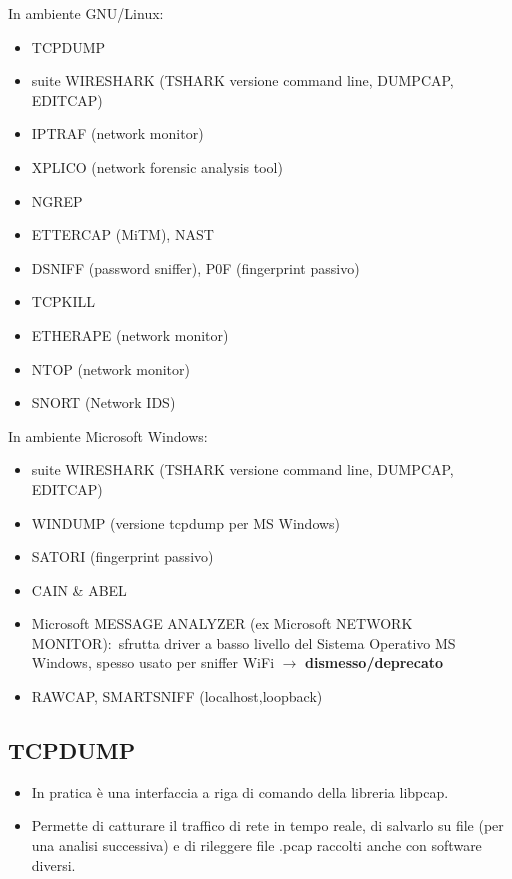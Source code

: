 In ambiente GNU/Linux:
\begin{itemize}
    \item TCPDUMP
    \item suite WIRESHARK (TSHARK versione command line, DUMPCAP, EDITCAP)
    \item IPTRAF (network monitor)
    \item XPLICO (network forensic analysis tool)
    \item NGREP
    \item ETTERCAP (MiTM), NAST
    \item DSNIFF (password sniffer), P0F (fingerprint passivo)
    \item TCPKILL
    \item ETHERAPE (network monitor)
    \item NTOP (network monitor)
    \item SNORT (Network IDS)
\end{itemize}
In ambiente Microsoft Windows:
\begin{itemize}
    \item suite WIRESHARK (TSHARK versione command line, DUMPCAP, EDITCAP)
    \item WINDUMP (versione tcpdump per MS Windows)
    \item SATORI (fingerprint passivo)
    \item CAIN \& ABEL
    \item Microsoft MESSAGE ANALYZER (ex Microsoft NETWORK MONITOR):\ sfrutta driver a basso livello del Sistema Operativo MS Windows, spesso usato per sniffer WiFi $\rightarrow$ \textbf{dismesso/deprecato}
    \item RAWCAP, SMARTSNIFF (localhost,loopback)
\end{itemize}

\subsection{TCPDUMP}

\begin{itemize}
    \item In pratica è una interfaccia a riga di comando della libreria libpcap.\

    \item Permette di catturare il traffico di rete in tempo reale, di salvarlo su file (per una analisi successiva) e di rileggere file .pcap raccolti anche con software diversi.
\end{itemize}

